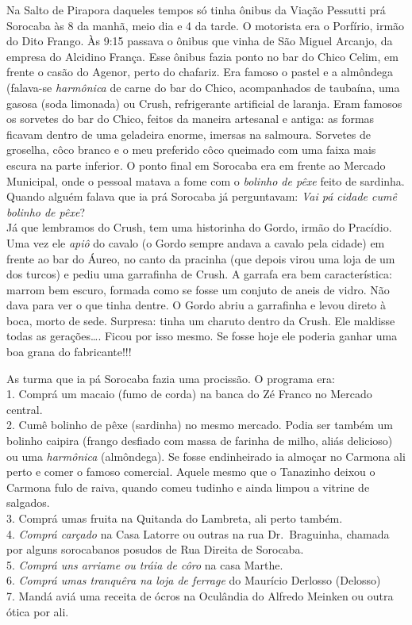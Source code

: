 \documentclass[12pt,brazil,]{book}
\begin{document}
Na Salto de Pirapora daqueles tempos só tinha ônibus da Viação Pessutti
prá Sorocaba às 8 da manhã, meio dia e 4 da tarde. O motorista era o
Porfírio, irmão do Dito Frango. Às 9:15 passava o ônibus que vinha de
São Miguel Arcanjo, da empresa do Alcidino França. Esse ônibus fazia
ponto no bar do Chico Celim, em frente o casão do Agenor, perto do
chafariz. Era famoso o pastel e a almôndega (falava-se \emph{harmônica}
de carne do bar do Chico, acompanhados de taubaína, uma gasosa (soda
limonada) ou Crush, refrigerante artificial de laranja. Eram famosos os
sorvetes do bar do Chico, feitos da maneira artesanal e antiga: as
formas ficavam dentro de uma geladeira enorme, imersas na salmoura.
Sorvetes de groselha, côco branco e o meu preferido côco queimado com
uma faixa mais escura na parte inferior. O ponto final em Sorocaba era
em frente ao Mercado Municipal, onde o pessoal matava a fome com o
\emph{bolinho de pêxe} feito de sardinha. Quando alguém falava que ia
prá Sorocaba já perguntavam: \emph{Vai pá cidade cumê bolinho de
pêxe}?\\
Já que lembramos do Crush, tem uma historinha do Gordo, irmão do
Pracídio. Uma vez ele \emph{apiô} do cavalo (o Gordo sempre andava a
cavalo pela cidade) em frente ao bar do Áureo, no canto da pracinha (que
depois virou uma loja de um dos turcos) e pediu uma garrafinha de Crush.
A garrafa era bem característica: marrom bem escuro, formada como se
fosse um conjuto de aneis de vidro. Não dava para ver o que tinha
dentre. O Gordo abriu a garrafinha e levou direto à boca, morto de sede.
Surpresa: tinha um charuto dentro da Crush. Ele maldisse todas as
gerações\ldots{}. Ficou por isso mesmo. Se fosse hoje ele poderia ganhar
uma boa grana do fabricante!!!

As turma que ia pá Sorocaba fazia uma procissão. O programa era:\\
1. Comprá um macaio (fumo de corda) na banca do Zé Franco no Mercado
central.\\
2. Cumê bolinho de pêxe (sardinha) no mesmo mercado. Podia ser também um
bolinho caipira (frango desfiado com massa de farinha de milho, aliás
delicioso) ou uma \emph{harmônica} (almôndega). Se fosse endinheirado ia
almoçar no Carmona ali perto e comer o famoso comercial. Aquele mesmo
que o Tanazinho deixou o Carmona fulo de raiva, quando comeu tudinho e
ainda limpou a vitrine de salgados.\\
3. Comprá umas fruita na Quitanda do Lambreta, ali perto também.\\
4. \emph{Comprá carçado} na Casa Latorre ou outras na rua Dr.~Braguinha,
chamada por alguns sorocabanos posudos de Rua Direita de Sorocaba.\\
5. \emph{Comprá uns arriame ou tráia de côro} na casa Marthe.\\
6. \emph{Comprá umas tranquêra na loja de ferrage} do Maurício Derlosso
(Delosso)\\
7. Mandá aviá uma receita de ócros na Oculândia do Alfredo Meinken ou
outra ótica por ali.
\end{document}
